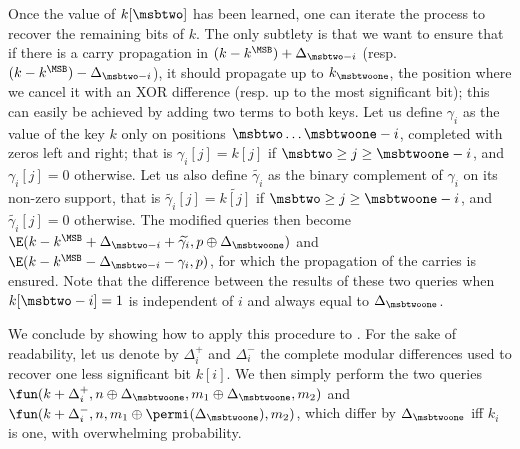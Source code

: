 Once the value of $k[\msbtwo]$ has been learned, one can iterate the process to recover the remaining bits of $k$.
The only subtlety is that we want to ensure that if there is a carry propagation in
$(k - k^\MSB) + \Delta_{\msbtwo - i}$ (resp. $(k - k^\MSB) - \Delta_{\msbtwo - i}$),
it should propagate up to $k_{\msbtwoone}$, the position where we cancel it with an XOR difference
(resp. up to the most significant bit); this can easily be achieved by adding two terms to both keys.
Let us define $\gamma_i$ as the value of the key $k$ only on positions $\msbtwo\ldots\msbtwoone - i$, completed with zeros left and right;
that is $\gamma_i[j] = k[j]$ if $\msbtwo \geq j \geq \msbtwoone - i$, and $\gamma_i[j] = 0$ otherwise.
Let us also define $\widetilde{\gamma_i}$ as the binary complement of $\gamma_i$ on its non-zero support,
that is $\widetilde{\gamma_i}[j] = \widetilde{k[j]}$ if $\msbtwo \geq j \geq \msbtwoone - i$, and $\widetilde{\gamma_i}[j] = 0$ otherwise.
The modified queries then become $\E(k - k^\MSB + \Delta_{\msbtwo - i} + \widetilde{\gamma_i}, p \oplus \Delta_{\msbtwoone})$ and
$\E(k - k^\MSB - \Delta_{\msbtwo - i} - \gamma_i, p)$, for which the propagation of the carries is ensured. Note that
the difference between the results of these two queries when $k[\msbtwo - i] = 1$ is independent of $i$ and always equal
to $\Delta_\msbtwoone$. 



We conclude by showing how to apply this procedure to \proestotr. For the sake of readability, let us denote
by $\Delta_i^+$ and $\Delta_i^-$ the complete modular differences used to recover one less significant bit $k[i]$.
We then simply perform the two queries $\fun(k + \Delta_i^+, n \oplus \Delta_{\msbtwoone}, m_1 \oplus \Delta_{\msbtwoone}, m_2)$
and $\fun(k + \Delta_i^-, n, m_1 \oplus \permi(\Delta_{\msbtwoone}), m_2)$, which differ by $\Delta_{\msbtwoone}$ iff $k_i$ is one,
with overwhelming probability.

